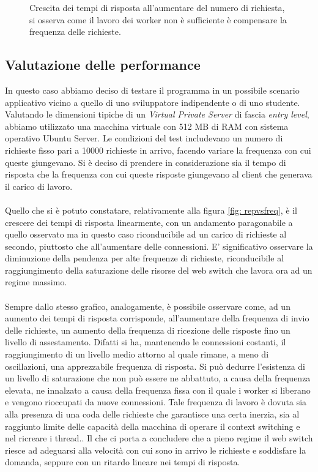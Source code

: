 \documentclass[italian]{tktltiki2}
\begin{document}
\begin{figure}[H]
\caption{Crescita dei tempi di risposta all'aumentare del numero di richiesta, si osserva come il lavoro dei worker non è sufficiente è compensare la frequenza delle richieste. \label{fig: cfr_reply_time2}}
\end{figure}
\subsection{Valutazione delle performance}
In questo caso abbiamo deciso di testare il programma in un possibile scenario applicativo vicino a quello di uno sviluppatore indipendente o di uno studente. Valutando le dimensioni tipiche di un \emph{Virtual Private Server} di fascia \emph{entry level}, abbiamo utilizzato una macchina virtuale con 512 MB di RAM con sistema operativo Ubuntu Server. Le condizioni del test includevano un numero di richieste fisso pari a 10000 richieste in arrivo, facendo variare la frequenza con cui queste giungevano. Si è deciso di prendere in considerazione sia il tempo di risposta che la frequenza con cui queste risposte giungevano al client che generava il carico di lavoro. \\\\ 
Quello che si è potuto constatare, relativamente alla figura \ref{fig: repvsfreq}, è il crescere dei tempi di risposta linearmente, con un andamento paragonabile a quello osservato ma in questo caso riconducibile ad un carico di richieste al secondo, piuttosto che all'aumentare delle connessioni. E' significativo osservare la diminuzione della pendenza per alte frequenze di richieste, riconducibile al raggiungimento della saturazione delle risorse del web switch che lavora ora ad un regime massimo.\\\\
Sempre dallo stesso grafico, analogamente, è possibile osservare come, ad un aumento dei tempi di risposta corrisponde, all'aumentare della frequenza di invio delle richieste, un aumento della frequenza di ricezione delle risposte fino un livello di assestamento. Difatti si ha, mantenendo le connessioni costanti, il raggiungimento di un livello medio attorno al quale rimane, a meno di oscillazioni, una apprezzabile frequenza di risposta. Si può dedurre l'esistenza di un livello di saturazione che non può essere ne abbattuto, a causa della frequenza elevata, ne innalzato a causa della frequenza fissa con il quale i worker si liberano e vengono rioccupati da nuove connessioni. Tale frequenza di lavoro è dovuta sia alla presenza di una coda delle richieste che garantisce una certa inerzia, sia al raggiunto limite delle capacità della macchina di operare il context switching e nel ricreare i thread.. Il che ci porta a concludere che a pieno regime il web switch riesce ad adeguarsi alla velocità con cui sono in arrivo le richieste e soddisfare la domanda, seppure con un ritardo lineare nei tempi di risposta.
\end{document}
